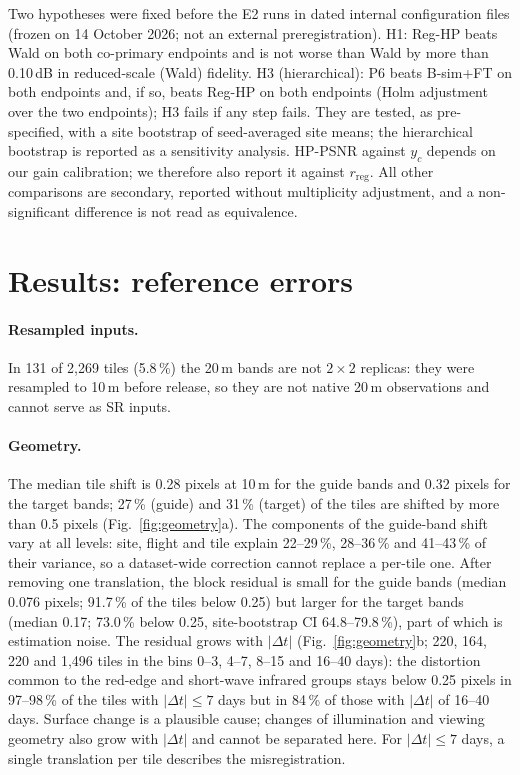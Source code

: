 \documentclass[pdflatex,sn-basic,referee,lineno]{sn-jnl}
\newcommand{\rreg}{r_{\mathrm{reg}}}
\begin{document}
Two hypotheses were fixed before the E2 runs in dated internal configuration files (frozen on 14 October 2026;
not an external preregistration). H1: Reg-HP beats Wald on both co-primary endpoints and is not worse than Wald by
more than 0.10\,dB in reduced-scale (Wald) fidelity. H3
(hierarchical): P6 beats B-sim+FT on both endpoints and, if so, beats Reg-HP on both endpoints (Holm adjustment over
the two endpoints); H3 fails if any step fails. They are tested, as pre-specified, with a site bootstrap of
seed-averaged site means; the hierarchical bootstrap is reported as a sensitivity analysis. HP-PSNR against $y_c$
depends on our gain calibration; we therefore also report it against $\rreg$. All other comparisons are secondary,
reported without multiplicity adjustment, and a non-significant difference is not read as equivalence.

\section{Results: reference errors}\label{sec:res-errors}

\paragraph{Resampled inputs.} In 131 of 2,269 tiles (5.8\,\%) the 20\,m bands are not $2\times2$ replicas: they
were resampled to 10\,m before release, so they are not native 20\,m observations and cannot serve as SR inputs.

\paragraph{Geometry.} The median tile shift is 0.28 pixels at 10\,m for the guide bands and 0.32 pixels for the
target bands; 27\,\% (guide) and 31\,\% (target) of the tiles are shifted by more than 0.5 pixels
(Fig.~\ref{fig:geometry}a). The components of the guide-band shift vary at all levels: site, flight and tile explain
22--29\,\%, 28--36\,\% and 41--43\,\% of their variance, so a dataset-wide correction cannot replace a per-tile one. After removing one
translation, the block residual is small for the guide bands (median 0.076 pixels; 91.7\,\% of the tiles below 0.25)
but larger for the target bands (median 0.17; 73.0\,\% below 0.25, site-bootstrap CI 64.8--79.8\,\%), part of which
is estimation noise. The residual grows with $|\Delta t|$ (Fig.~\ref{fig:geometry}b; 220, 164, 220 and 1,496 tiles
in the bins 0--3, 4--7, 8--15 and 16--40 days): the distortion common to the red-edge and short-wave infrared groups
stays below 0.25 pixels in 97--98\,\% of the tiles with $|\Delta t|\le7$ days but in 84\,\% of those with
$|\Delta t|$ of 16--40 days. Surface change is a plausible cause; changes of illumination and viewing geometry also
grow with $|\Delta t|$ and cannot be separated here. For $|\Delta t|\le7$ days, a single translation per tile
describes the misregistration.
\end{document}
